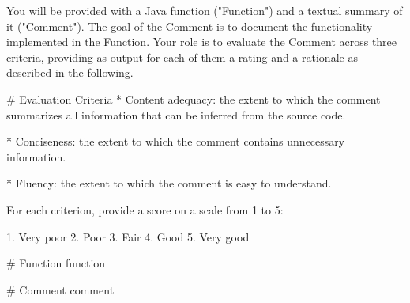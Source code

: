 You will be provided with a Java function ("Function") and a textual summary of it ("Comment"). The goal of the Comment is to document the functionality implemented in the Function. Your role is to evaluate the Comment across three criteria, providing as output for each of them a rating and a rationale as described in the following. 

# Evaluation Criteria
* Content adequacy: the extent to which the comment summarizes all information that can be inferred from the source code. 

* Conciseness: the extent to which the comment contains unnecessary information.

* Fluency: the extent to which the comment is easy to understand.

For each criterion, provide a score on a scale from 1 to 5:

1. Very poor
2. Poor
3. Fair
4. Good
5. Very good

# Function
{function}

# Comment
{comment}